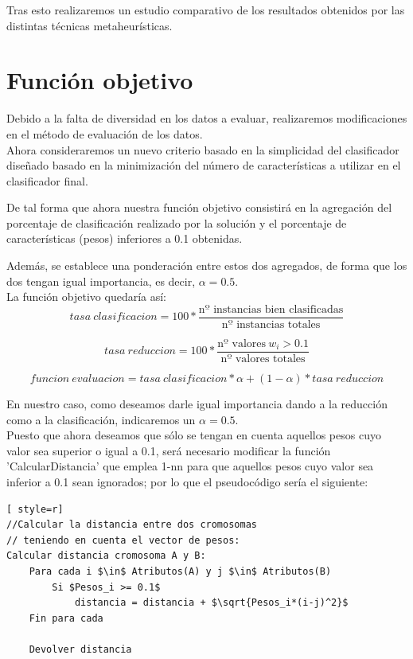 Tras esto realizaremos un estudio comparativo de los resultados obtenidos por las distintas técnicas metaheurísticas.

\section{Función objetivo}
Debido a la falta de diversidad en los datos a evaluar, realizaremos modificaciones en el método de evaluación de los datos.\\ 

Ahora consideraremos un nuevo criterio basado en la simplicidad del clasificador diseñado basado en la minimización del número de características a utilizar en el clasificador final.

De tal forma que ahora nuestra función objetivo consistirá en la agregación del porcentaje de clasificación realizado por la solución y el porcentaje de características (pesos) inferiores a 0.1 obtenidas.

Además, se establece una ponderación entre estos dos agregados, de forma que los dos tengan igual importancia, es decir, $\alpha=0.5$.\\ 
La función objetivo quedaría así:
\[
tasa \ clasificacion = 100*\frac{\text{nº instancias bien clasificadas}}{\text{nº instancias totales}}
\]

\[
tasa\ reduccion = 100*\frac{\text{nº valores}\ w_i > 0.1}{\text{nº valores totales}}
\]

\[
funcion \ evaluacion = tasa\ clasificacion*\alpha + (1-\alpha)*tasa\ reduccion
\]

En nuestro caso, como deseamos darle igual importancia dando a la reducción como a la clasificación, indicaremos un $\alpha=0.5$.\\ 

Puesto que ahora deseamos que sólo se tengan en cuenta aquellos pesos cuyo valor sea superior o igual a 0.1, será necesario modificar la función 'CalcularDistancia' que emplea 1-nn para que aquellos pesos cuyo valor sea inferior a 0.1 sean ignorados; por lo que el pseudocódigo sería el siguiente:

\begin{lstlisting}[ style=r]
//Calcular la distancia entre dos cromosomas
// teniendo en cuenta el vector de pesos:
Calcular distancia cromosoma A y B:
	Para cada i $\in$ Atributos(A) y j $\in$ Atributos(B)
		Si $Pesos_i >= 0.1$
			distancia = distancia + $\sqrt{Pesos_i*(i-j)^2}$
	Fin para cada
	
	Devolver distancia
\end{lstlisting}


